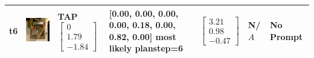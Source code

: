 \begin{longtable}{| V{0.8cm} | V{2.6cm} | V{1.6cm} | V{2.1cm} | V{1.55cm} | V{1.6cm} | V{3.2cm} |}
t6 &
\includegraphics[width=\linewidth]{fig/system/_fast2-tap2_.jpg} &
TAP
\linebreak\linebreak
$\begin{bmatrix}
0 \\
1.79 \\
-1.84
\end{bmatrix}$ &
[0.00, 0.00, 0.00, 0.00, 0.18, 0.00, 0.82, 0.00] most likely planstep=6 &
$\begin{bmatrix}
3.21 \\
0.98 \\
-0.47
\end{bmatrix}$ &
N/$A$ &
No Prompt
\\ \hline



\end{longtable}
